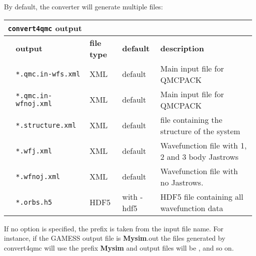 By default, the converter will generate multiple files:\\
\begin{table}[h]
\begin{center}
\begin{tabularx}{\textwidth}{l l l l l }
\hline
\multicolumn{5}{l}{\texttt{convert4qmc} output} \\
\hline
   &   \bfseries output     & \bfseries file type & \bfseries default   & \bfseries description \\
   &   \texttt{*.qmc.in-wfs.xml             } &  XML  & default& Main input file for QMCPACK\\
   &   \texttt{*.qmc.in-wfnoj.xml             } &  XML  & default& Main input file for QMCPACK\\
   &   \texttt{*.structure.xml             } &  XML   &default   & file containing the structure of the system\\
   &   \texttt{*.wfj.xml             } &  XML  & default & Wavefunction file with 1, 2 and 3 body Jastrows\\
   &   \texttt{*.wfnoj.xml             } &  XML   & default & Wavefunction file with no Jastrows. \\
   &   \texttt{*.orbs.h5             } &  HDF5   & with -hdf5   & HDF5 file containing all wavefunction data\\
    \hline
    \end{tabularx}
\end{center}
\end{table}

If no  option is specified, the prefix is taken from
the input file name. For instance, if the GAMESS output file is
\textbf{Mysim}.out the files generated by convert4qmc will use the
prefix \textbf{Mysim} and output files will be
,  and so on.

